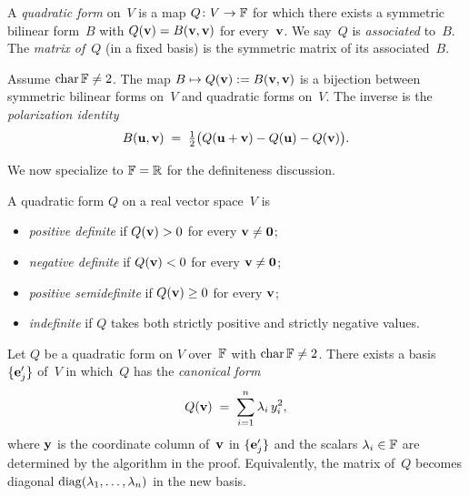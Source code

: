 \begin{definition}
\label{def:quadratic-form}
A \emph{quadratic form} on~$V$ is a map $Q \colon V \to \mathbb{F}$ for which
there exists a symmetric bilinear form~$B$ with
$Q(\mathbf{v}) = B(\mathbf{v}, \mathbf{v})$ for every~$\mathbf{v}$. We say~$Q$
is \emph{associated} to~$B$. The \emph{matrix of~$Q$} (in a fixed
basis) is the symmetric matrix of its associated~$B$.
\end{definition}

\begin{theorem}[Polarization]
\label{thm:polarization}
Assume $\operatorname{char} \mathbb{F} \neq 2$. The map
$B \mapsto Q(\mathbf{v}) := B(\mathbf{v}, \mathbf{v})$ is a bijection between
symmetric bilinear forms on~$V$ and quadratic forms on~$V$. The inverse
is the \emph{polarization identity}
\[
  B(\mathbf{u}, \mathbf{v}) \;=\; \tfrac{1}{2}\bigl(Q(\mathbf{u} + \mathbf{v}) - Q(\mathbf{u}) - Q(\mathbf{v})\bigr).
\]
\end{theorem}

We now specialize to $\mathbb{F} = \mathbb{R}$ for the definiteness discussion.

\begin{definition}
\label{def:definite}
A quadratic form $Q$ on a real vector space~$V$ is
\begin{itemize}
  \item \emph{positive definite} if $Q(\mathbf{v}) > 0$ for every $\mathbf{v} \neq \mathbf{0}$;
  \item \emph{negative definite} if $Q(\mathbf{v}) < 0$ for every $\mathbf{v} \neq \mathbf{0}$;
  \item \emph{positive semidefinite} if $Q(\mathbf{v}) \ge 0$ for every $\mathbf{v}$;
  \item \emph{indefinite} if $Q$ takes both strictly positive and strictly negative values.
\end{itemize}
\end{definition}

\begin{theorem}
\label{thm:lagrange-method}
Let $Q$ be a quadratic form on $V$ over~$\mathbb{F}$ with $\operatorname{char} \mathbb{F} \neq 2$.
There exists a basis $\{\mathbf{e}'_j\}$ of~$V$ in which~$Q$ has the
\emph{canonical form}
\[
  Q(\mathbf{v}) \;=\; \sum_{i=1}^{n} \lambda_i\, y_i^{2},
\]
where $\mathbf{y}$ is the coordinate column of~$\mathbf{v}$ in
$\{\mathbf{e}'_j\}$ and the scalars $\lambda_i \in \mathbb{F}$ are determined by
the algorithm in the proof. Equivalently, the matrix of~$Q$ becomes
diagonal $\operatorname{diag}(\lambda_1, \dots, \lambda_n)$ in the new basis.
\end{theorem}

